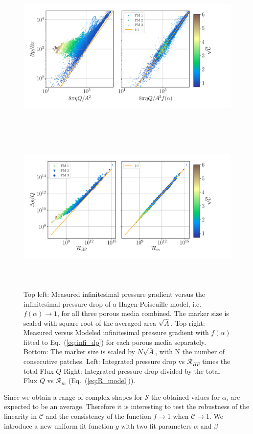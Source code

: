 \documentclass[draft]{agujournal2019}
\begin{document}
\begin{figure}
\includegraphics[height=8cm]{figures/infi_dpdx_combined.pdf}
\includegraphics[height=8cm]{figures/integral_R_combined.pdf}
\caption{Top left: Measured infinitesimal pressure gradient versus the infinitesimal pressure drop of a Hagen-Poiseuille model, i.e. $f(\alpha)\rightarrow 1$, for all three porous media combined. The marker size is scaled with square root of the averaged area $\sqrt{\overline{A}}$. Top right: Measured versus Modeled infinitesimal pressure gradient with $f(\alpha)$ fitted to Eq.~(\ref{eq:infi_dp}) for each porous media separately. Bottom: The marker size is scaled by $N\sqrt{\overline{A}}$, with N the number of consecutive patches. Left: Integrated pressure drop vs $\mathcal{R}_{HP}$ times the total Flux $Q$ Right: Integrated pressure drop divided by the total Flux $Q$ vs $\mathcal{R}_m$ (Eq.~(\ref{eq:R_model})). }
\label{fig:local_and_integrated}
\end{figure}


Since we obtain a range of complex shapes for $\mathcal{S}$ the obtained values for $\alpha_i$ are expected to be an average. Therefore it is interesting to test the robustness of the linearity in $\mathcal{C}$ and the consistency of the function $f \rightarrow 1$ when $\mathcal{C}\rightarrow 1$. We introduce a new uniform fit function $g$ with two fit parameters $\alpha$ and $\beta$ 
\end{document}
